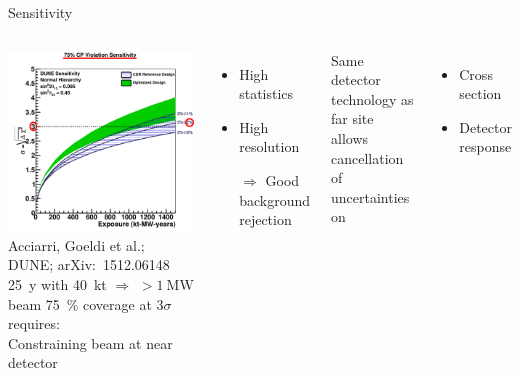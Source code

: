 \documentclass[]{beamer}
\newcommand*{\emphcol}{red}
\newcommand*{\dune}{{DUNE}}
\begin{document}
\begin{frame}{Sensitivity}
	\begin{columns}[c]
		\centering
		\includegraphics[width=\textwidth]{defence/cpv75_exp_syst}\\
		{\tiny Acciarri, Goeldi et al.; \dune{}; arXiv:~1512.06148~\cite{dune2}}\\
		\SI{25}{y} with \SI{40}{\kilo\tonne} {\color{\emphcol} $\Rightarrow$ $> \SI{1}{\mega\watt}$ beam}
		\SI{75}{\percent} coverage at $\num{3}\sigma$ requires:\\
		{\color{\emphcol} Constraining beam at near detector}
		\begin{itemize}
			\item High statistics
			\item High resolution
			\item[$\Rightarrow$] Good background rejection
		\end{itemize}
		Same detector technology as far site allows cancellation of uncertainties on
		\begin{itemize}
			\item Cross section
			\item Detector response
		\end{itemize}
	\end{columns}
\end{frame}
\end{document}
